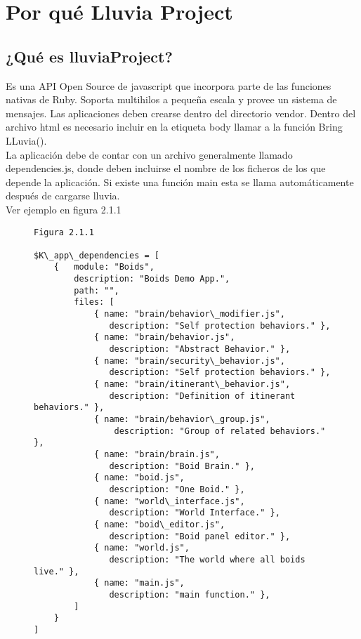 \section{Por qué Lluvia Project}
\label{section:por_que}

\subsection{¿Qué es lluviaProject?}
\label{subsection:que_es}

Es una API Open Source de javascript  que incorpora parte de las funciones nativas de Ruby. Soporta multihilos a pequeña escala y provee un 
sistema de mensajes. Las aplicaciones deben crearse dentro del directorio vendor. Dentro del archivo html es necesario incluir en la 
etiqueta body llamar a la función Bring LLuvia().\\

La aplicación debe de contar con un archivo generalmente llamado dependencies.js, donde deben incluirse el nombre de los ficheros de los que 
depende la aplicación. Si existe una función main esta se llama automáticamente después de cargarse lluvia.\\

Ver ejemplo en figura 2.1.1
\begin{figure}[p]
\begin{verbatim}
Figura 2.1.1

$K\_app\_dependencies = [
    {   module: "Boids", 
        description: "Boids Demo App.",
        path: "",
        files: [
            { name: "brain/behavior\_modifier.js",  
               description: "Self protection behaviors." },
            { name: "brain/behavior.js",           
               description: "Abstract Behavior." },
            { name: "brain/security\_behavior.js",  
               description: "Self protection behaviors." },
            { name: "brain/itinerant\_behavior.js", 
               description: "Definition of itinerant behaviors." },
            { name: "brain/behavior\_group.js",     
                description: "Group of related behaviors." },
            { name: "brain/brain.js",              
               description: "Boid Brain." },
            { name: "boid.js",                     
               description: "One Boid." },
            { name: "world\_interface.js",          
               description: "World Interface." },
            { name: "boid\_editor.js",              
               description: "Boid panel editor." },
            { name: "world.js",                    
               description: "The world where all boids live." },
            { name: "main.js",                     
               description: "main function." },
        ]
    }
]
\end{verbatim}
\end{figure}



